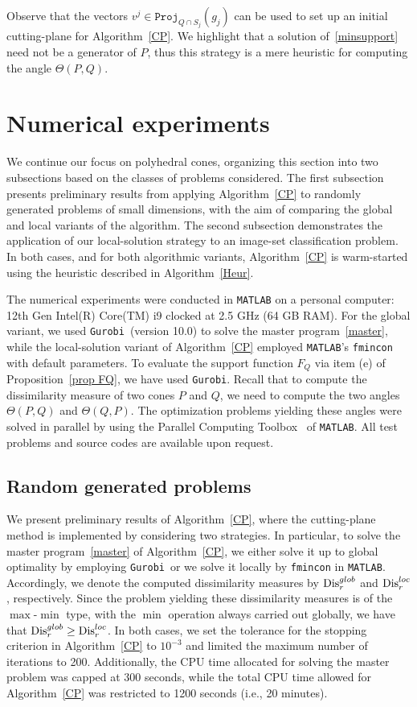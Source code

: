 \documentclass[hidelinks,onefignum,onetabnum]{siamart250211}
\theoremstyle{definition}
\theoremstyle{remark}
\newcommand{\gu}{\texttt{Gurobi}}
\newcommand{\matlab}{\texttt{MATLAB}}
\newcommand{\proj}{\mathtt{Proj}}
\newcommand{\Dis}{{\rm Dis}}
\begin{document}
Observe that the vectors $v^j \in \proj_{Q\cap S_j}(g_j)$ can be used to set up an initial cutting-plane for Algorithm~\ref{CP}.
We highlight that a solution of~\eqref{minsupport} need not be a generator of $P$, thus this strategy is a mere heuristic for computing the angle $\Theta(P,Q)$. 


\section{Numerical experiments}\label{sec:numexp}
We continue our focus on polyhedral cones, organizing this section into two subsections based on the classes of problems considered. The first subsection presents preliminary results from applying Algorithm~\ref{CP} to randomly generated problems of small dimensions, with the aim of comparing the global and local variants of the algorithm. The second subsection demonstrates the application of our local-solution strategy to an image-set classification problem. In both cases, and for both algorithmic variants, Algorithm~\ref{CP} is warm-started using the heuristic described in Algorithm~\ref{Heur}.

The numerical experiments were conducted in \texttt{MATLAB} on a personal computer: 12th Gen Intel(R) Core(TM) i9 clocked at 2.5 GHz (64 GB RAM). For the global variant, we used \gu~(version 10.0) \cite{Gurobi} to solve the master program~\eqref{master}, while the local-solution variant of Algorithm~\ref{CP} employed \texttt{MATLAB}’s \texttt{fmincon} with default parameters. To evaluate the support function $F_Q$ via item (e) of Proposition~\ref{prop FQ}, we have used \gu. Recall that to compute the dissimilarity measure of two cones $P$ and $Q$, we need to compute the two angles $\Theta(P,Q)$ and $\Theta(Q,P)$. The optimization problems yielding these angles were solved in parallel by using the Parallel Computing  Toolbox~\cite{ParallelComputingToolbox} of \matlab.
All test problems and source codes are available upon request.
%
\subsection{Random generated problems}
We present preliminary results of Algorithm~\ref{CP}, where the cutting-plane method is implemented by considering two strategies. In particular, to solve the master program~\eqref{master} of Algorithm~\ref{CP}, we either solve it up to global optimality by employing \gu~or we solve it locally by \texttt{fmincon} in \matlab. Accordingly, we denote the computed dissimilarity measures by $\Dis_r^{glob}$ and  $\Dis_r^{loc}$, respectively.
Since the problem yielding these dissimilarity measures is of the $\max$-$\min$ type, with the $\min$ operation always carried out globally, we have that $\Dis_r^{glob} \geq \Dis_r^{loc}$. In both cases, we set the tolerance for the stopping criterion in Algorithm~\ref{CP} to $10^{-3}$ and limited the maximum number of iterations to 200. Additionally, the CPU time allocated for solving the master problem was capped at 300 seconds, while the total CPU time allowed for Algorithm~\ref{CP} was restricted to 1200 seconds (i.e., 20 minutes).
\end{document}
